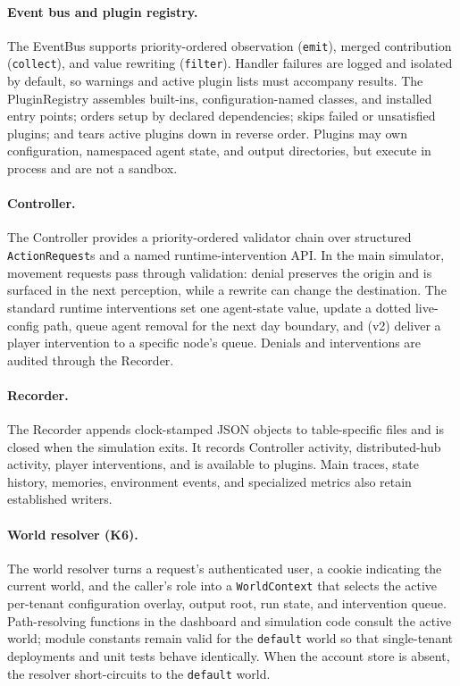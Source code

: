 \paragraph{Event bus and plugin registry.}
The EventBus supports priority-ordered observation (\texttt{emit}), merged
contribution (\texttt{collect}), and value rewriting (\texttt{filter}).
Handler failures are logged and isolated by default, so warnings and active
plugin lists must accompany results.  The PluginRegistry assembles built-ins,
configuration-named classes, and installed entry points; orders setup by
declared dependencies; skips failed or unsatisfied plugins; and tears active
plugins down in reverse order.  Plugins may own configuration, namespaced
agent state, and output directories, but execute in process and are not a
sandbox.

\paragraph{Controller.}
The Controller provides a priority-ordered validator chain over structured
\texttt{ActionRequest}s and a named runtime-intervention API.  In the main
simulator, movement requests pass through validation: denial preserves the
origin and is surfaced in the next perception, while a rewrite can change the
destination.  The standard runtime interventions set one agent-state value,
update a dotted live-config path, queue agent removal for the next day
boundary, and (v2) deliver a player intervention to a specific node's queue.
Denials and interventions are audited through the Recorder.

\paragraph{Recorder.}
The Recorder appends clock-stamped JSON objects to table-specific files and
is closed when the simulation exits.  It records Controller activity,
distributed-hub activity, player interventions, and is available to plugins.
Main traces, state history, memories, environment events, and specialized
metrics also retain established writers.

\paragraph{World resolver (K6).}
The world resolver turns a request's authenticated user, a cookie indicating
the current world, and the caller's role into a \texttt{WorldContext} that
selects the active per-tenant configuration overlay, output root, run state,
and intervention queue.  Path-resolving functions in the dashboard and
simulation code consult the active world; module constants remain valid for
the \texttt{default} world so that single-tenant deployments and unit tests
behave identically.  When the account store is absent, the resolver
short-circuits to the \texttt{default} world.

